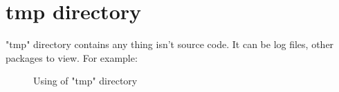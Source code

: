 \section{tmp directory}

\begin{crules}
\end{crules}

"tmp" directory contains any thing isn't source code. It can be log files,
other packages to view. For example:

\begin{figure}[h]
    \caption{Using of "tmp" directory}
    
\end{figure}
